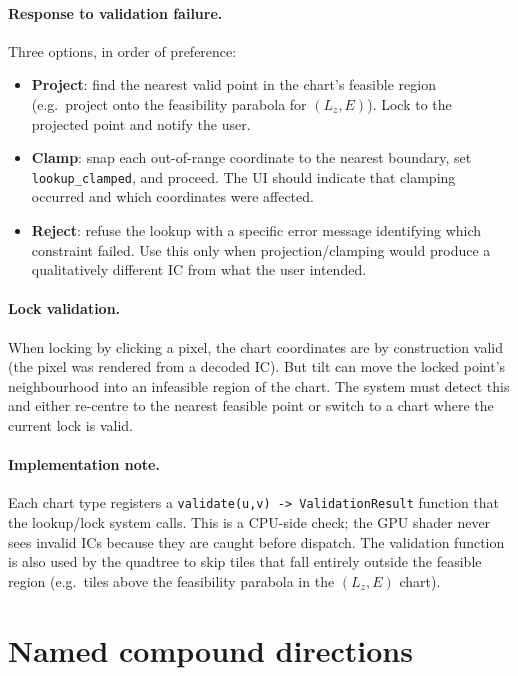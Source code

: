 \documentclass[11pt]{report}
\begin{document}
\paragraph{Response to validation failure.} Three options, in order of preference:
\begin{itemize}[nosep]
\item \textbf{Project}: find the nearest valid point in the chart's feasible region (e.g.\ project onto the feasibility parabola for $(L_z,E)$). Lock to the projected point and notify the user.
\item \textbf{Clamp}: snap each out-of-range coordinate to the nearest boundary, set \texttt{lookup\_clamped}, and proceed. The UI should indicate that clamping occurred and which coordinates were affected.
\item \textbf{Reject}: refuse the lookup with a specific error message identifying which constraint failed. Use this only when projection/clamping would produce a qualitatively different IC from what the user intended.
\end{itemize}

\paragraph{Lock validation.} When locking by clicking a pixel, the chart coordinates are by construction valid (the pixel was rendered from a decoded IC). But tilt can move the locked point's neighbourhood into an infeasible region of the chart. The system must detect this and either re-centre to the nearest feasible point or switch to a chart where the current lock is valid.

\paragraph{Implementation note.} Each chart type registers a \texttt{validate(u,v) -> ValidationResult} function that the lookup/lock system calls. This is a CPU-side check; the GPU shader never sees invalid ICs because they are caught before dispatch. The validation function is also used by the quadtree to skip tiles that fall entirely outside the feasible region (e.g.\ tiles above the feasibility parabola in the $(L_z,E)$ chart).

\section{Named compound directions}
\label{sec:named_directions}
\end{document}
